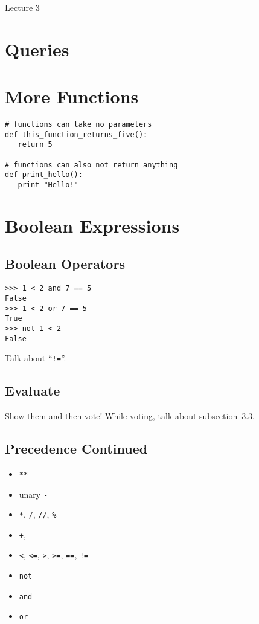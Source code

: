 \documentclass[12pt]{article}
\begin{document}
\begin{center}
   \LARGE Lecture 3
\end{center}

\setcounter{section}{-1}
\section{Queries}

\section{More Functions}

\begin{lstlisting}
# functions can take no parameters
def this_function_returns_five():
   return 5

# functions can also not return anything
def print_hello():
   print "Hello!"
\end{lstlisting}

\section{Boolean Expressions}

\subsection{Boolean Operators}
\begin{lstlisting}
>>> 1 < 2 and 7 == 5
False
>>> 1 < 2 or 7 == 5
True
>>> not 1 < 2
False
\end{lstlisting}

\noindent
Talk about ``\lstinline{!=}''.

\subsection{Evaluate}

Show them and then vote!  While voting, talk about subsection~\ref{ssec:prec}.

\subsection{Precedence Continued}\label{ssec:prec}
\begin{itemize}
   \item \lstinline{**}
   \item unary \lstinline{-}
   \item \lstinline{*}, \lstinline{/}, \lstinline{//}, \lstinline{%}
   \item \lstinline{+}, \lstinline{-}
   \item \lstinline{<}, \lstinline{<=}, \lstinline{>}, \lstinline{>=},
      \lstinline{==}, \lstinline{!=}
   \item \lstinline{not}
   \item \lstinline{and}
   \item \lstinline{or}
\end{itemize}
\end{document}

